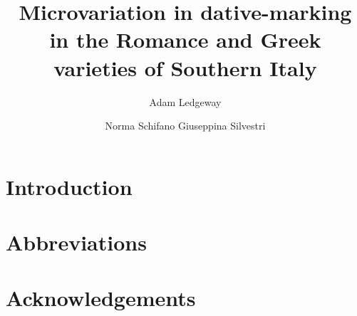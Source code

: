 \documentclass[output=paper]{langsci/langscibook}
\author{Adam Ledgeway\affiliation{}\and
Norma Schifano\affiliation{}\lastand
Giuseppina Silvestri\affiliation{}}
\title{Microvariation in dative-marking in the Romance and Greek varieties of Southern Italy}
\begin{document}
\section{Introduction}  
 
\section*{Abbreviations}
\section*{Acknowledgements}

\sloppy
\printbibliography[heading=subbibliography,notkeyword=this] 
\end{document}
